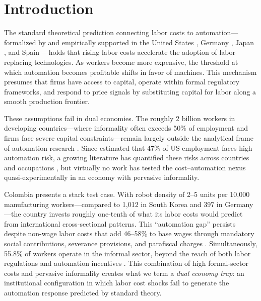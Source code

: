 \documentclass[a4paper,fleqn]{cas-sc}
\begin{document}
\linenumbers

\section{Introduction}
\label{sec:introduction}

The standard theoretical prediction connecting labor costs to automation---formalized by \citet{acemoglu2019automation} and empirically supported in the United States \citep{acemoglu2020robots}, Germany \citep{dauth2021}, Japan \citep{adachi2022}, and Spain \citep{koch2021}---holds that rising labor costs accelerate the adoption of labor-replacing technologies. As workers become more expensive, the threshold at which automation becomes profitable shifts in favor of machines. This mechanism presumes that firms have access to capital, operate within formal regulatory frameworks, and respond to price signals by substituting capital for labor along a smooth production frontier.

These assumptions fail in dual economies. The roughly 2 billion workers in developing countries---where informality often exceeds 50\% of employment and firms face severe capital constraints---remain largely outside the analytical frame of automation research \citep{laporta2014, arias2023informality}. Since \citet{frey2017future} estimated that 47\% of US employment faces high automation risk, a growing literature has quantified these risks across countries and occupations \citep{arntz2016, webb2020, eloundou2023gpts}, but virtually no work has tested the cost--automation nexus quasi-experimentally in an economy with pervasive informality.

Colombia presents a stark test case. With robot density of 2--5 units per 10,000 manufacturing workers---compared to 1,012 in South Korea and 397 in Germany \citep{ifr2024}---the country invests roughly one-tenth of what its labor costs would predict from international cross-sectional patterns. This ``automation gap'' persists despite non-wage labor costs that add 46--58\% to base wages through mandatory social contributions, severance provisions, and parafiscal charges \citep{anif2018}. Simultaneously, 55.8\% of workers operate in the informal sector, beyond the reach of both labor regulations and automation incentives \citep{arias2023informality}. This combination of high formal-sector costs and pervasive informality creates what we term a \emph{dual economy trap}: an institutional configuration in which labor cost shocks fail to generate the automation response predicted by standard theory.
\end{document}
